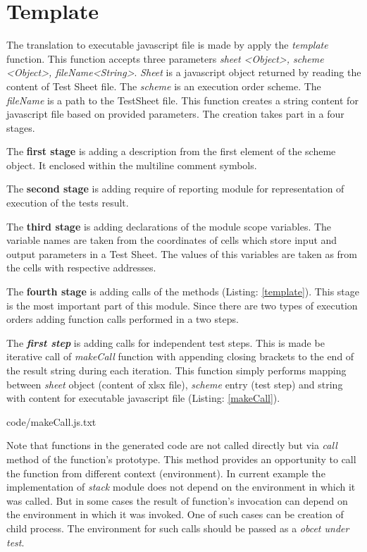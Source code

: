 \section{Template}
The translation to executable javascript file is made by apply the \textit{template} function. This function accepts three parameters \textit{sheet <Object>, scheme <Object>, fileName<String>}. \textit{Sheet} is a javascript object returned by reading the content of Test Sheet file. The \textit{scheme} is an execution order scheme. The \textit{fileName} is a path to the TestSheet file. This function creates a string content for javascript file based on provided parameters. The creation takes part in a four stages. 


The \textbf{first stage} is adding a description from the first element of the scheme object. It enclosed within the multiline comment symbols.


The \textbf{second stage} is adding require of reporting module for representation of execution of the tests result.


The \textbf{third stage} is adding declarations of the module scope variables. The variable names are taken from the coordinates of cells which store input and output parameters in a Test Sheet. The values of this variables are taken as from the cells with respective addresses.


The \textbf{fourth stage} is adding calls of the methods (Listing: \ref{template}). This stage is the most important part of this module. Since there are two types of execution orders adding function calls performed in a two steps. 


The \textit{\textbf{first step}} is adding calls for independent test steps. This is made be iterative call of \textit{makeCall} function with appending closing brackets to the end of the result string during each iteration. This function simply performs mapping between \textit{sheet} object (content of xlsx file), \textit{scheme} entry (test step) and string with content for executable javascript file (Listing: \ref{makeCall}).


{code/makeCall.js.txt}

Note that functions in the generated code are not called directly but via \textit{call} method of the function's prototype. This method provides an opportunity to call the function from different context (environment). In current example the implementation of \textit{stack} module does not depend on the environment in which it was called. But in some cases the result of function's invocation can depend on the environment in which it was invoked. One of such cases can be creation of child process. The environment for such calls should be passed as a \textit{obcet under test}.


